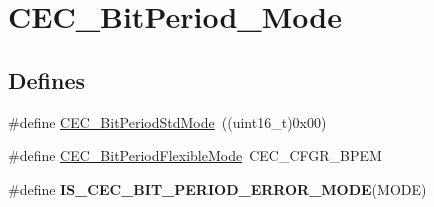 \hypertarget{group__CEC__BitPeriod__Mode}{
\section{CEC\_\-BitPeriod\_\-Mode}
\label{group__CEC__BitPeriod__Mode}
}
\subsection*{Defines}
\begin{DoxyCompactItemize}
\item 
\#define \hyperlink{group__CEC__BitPeriod__Mode_ga746ce0a831dfd76a47add310662c7f07}{CEC\_\-BitPeriodStdMode}~((uint16\_\-t)0x00)
\item 
\#define \hyperlink{group__CEC__BitPeriod__Mode_ga5bf4c1b257b837770d4d59c93cca6902}{CEC\_\-BitPeriodFlexibleMode}~CEC\_\-CFGR\_\-BPEM
\item 
\#define {\bfseries IS\_\-CEC\_\-BIT\_\-PERIOD\_\-ERROR\_\-MODE}(MODE)
\end{DoxyCompactItemize}


